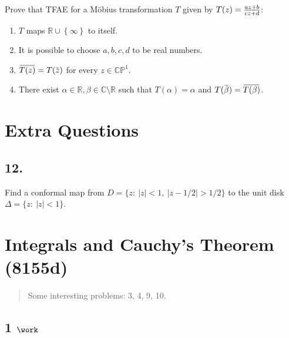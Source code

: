Prove that TFAE for a Möbius transformation \(T\) given by
\(T(z) = {az + b \over cz + d}\):

\begin{enumerate}
\def\labelenumi{\alph{enumi}.}
\tightlist
\item
  \(T\) maps \({\mathbb{R}}\cup\left\{{\infty}\right\}\) to itself.
\item
  It is possible to choose \(a,b,c,d\) to be real numbers.
\item
  \(\mkern 1.5mu\overline{\mkern-1.5muT(z)\mkern-1.5mu}\mkern 1.5mu = T(\mkern 1.5mu\overline{\mkern-1.5muz\mkern-1.5mu}\mkern 1.5mu)\)
  for every \(z\in {\mathbb{CP}}^1\).
\item
  There exist
  \(\alpha\in {\mathbb{R}}, \beta \in {\mathbb{C}}\setminus {\mathbb{R}}\)
  such that \(T(\alpha) = \alpha\) and
  \(T(\mkern 1.5mu\overline{\mkern-1.5mu\beta\mkern-1.5mu}\mkern 1.5mu) = \mkern 1.5mu\overline{\mkern-1.5muT(\beta)\mkern-1.5mu}\mkern 1.5mu\).
\end{enumerate}

\hypertarget{extra-questions}{%
\section{Extra Questions}\label{extra-questions}}

\hypertarget{section-4}{%
\subsection{12.}\label{section-4}}

Find a conformal map from \(D = \{z :\  |z| < 1,\ |z - 1/2| > 1/2\}\) to
the unit disk \(\Delta=\{z: \ |z|<1\}\).

\hypertarget{integrals-and-cauchys-theorem-8155d}{%
\section{Integrals and Cauchy's Theorem
(8155d)}\label{integrals-and-cauchys-theorem-8155d}}

\begin{quote}
Some interesting problems: 3, 4, 9, 10.
\end{quote}

\hypertarget{work-28}{%
\subsection{\texorpdfstring{1
\(\work\)}{1 \textbackslash work}}\label{work-28}}

